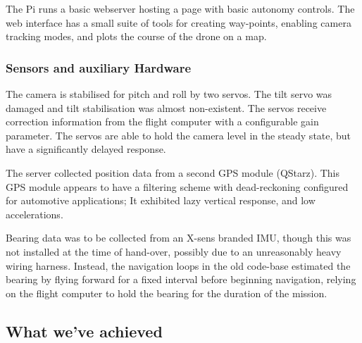 \documentclass[a4paper, 11pt, titlepage]{article}
\begin{document}
      The Pi runs a basic webserver hosting a page with basic autonomy controls.  The web interface has a small suite of tools for creating way-points, enabling camera tracking modes, and plots the course of the drone on a map.

    \subsubsection{Sensors and auxiliary Hardware}
      The camera is stabilised for pitch and roll by two servos. The tilt servo was damaged and tilt stabilisation was almost non-existent.  The servos receive correction information from the flight computer with a configurable gain parameter.  The servos are able to hold the camera level in the steady state, but have a significantly delayed response.

      The server collected position data from a second GPS module (QStarz).  This GPS module appears to have a filtering scheme with dead-reckoning configured for automotive applications; It exhibited lazy vertical response, and low accelerations.

      Bearing data was to be collected from an X-sens branded IMU, though this was not installed at the time of hand-over, possibly due to an unreasonably heavy wiring harness.  Instead, the navigation loops in the old code-base estimated the bearing by flying forward for a fixed interval before beginning navigation, relying on the flight computer to hold the bearing for the duration of the mission.

  \subsection{What we've achieved}
\end{document}
